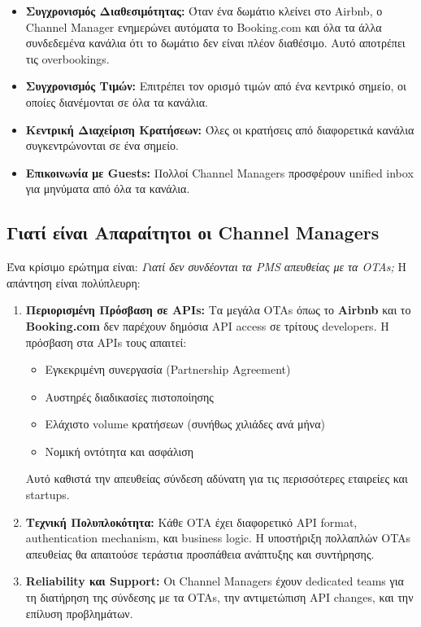 \documentclass[
	12pt, %
	oneside, %
	greek,
	onehalfspacing, %
	liststotoc, %
	toctotoc, %
	parskip, %
	headsepline, %
]{MastersDoctoralThesis} %
\begin{document}
\begin{itemize}
    \item \textbf{Συγχρονισμός Διαθεσιμότητας:} Όταν ένα δωμάτιο κλείνει στο Airbnb, ο Channel Manager ενημερώνει αυτόματα το Booking.com και όλα τα άλλα συνδεδεμένα κανάλια ότι το δωμάτιο δεν είναι πλέον διαθέσιμο. Αυτό αποτρέπει τις overbookings.
    \item \textbf{Συγχρονισμός Τιμών:} Επιτρέπει τον ορισμό τιμών από ένα κεντρικό σημείο, οι οποίες διανέμονται σε όλα τα κανάλια.
    \item \textbf{Κεντρική Διαχείριση Κρατήσεων:} Όλες οι κρατήσεις από διαφορετικά κανάλια συγκεντρώνονται σε ένα σημείο.
    \item \textbf{Επικοινωνία με Guests:} Πολλοί Channel Managers προσφέρουν unified inbox για μηνύματα από όλα τα κανάλια.
\end{itemize}

\subsection{Γιατί είναι Απαραίτητοι οι Channel Managers}
\label{subsec:why-channel-managers}

Ένα κρίσιμο ερώτημα είναι: \textit{Γιατί δεν συνδέονται τα PMS απευθείας με τα OTAs;} Η απάντηση είναι πολύπλευρη:

\begin{enumerate}
    \item \textbf{Περιορισμένη Πρόσβαση σε APIs:} Τα μεγάλα OTAs όπως το \textbf{Airbnb} και το \textbf{Booking.com} δεν παρέχουν δημόσια API access σε τρίτους developers. Η πρόσβαση στα APIs τους απαιτεί:
    \begin{itemize}
        \item Εγκεκριμένη συνεργασία (Partnership Agreement)
        \item Αυστηρές διαδικασίες πιστοποίησης
        \item Ελάχιστο volume κρατήσεων (συνήθως χιλιάδες ανά μήνα)
        \item Νομική οντότητα και ασφάλιση
    \end{itemize}
    Αυτό καθιστά την απευθείας σύνδεση αδύνατη για τις περισσότερες εταιρείες και startups.
    
    \item \textbf{Τεχνική Πολυπλοκότητα:} Κάθε OTA έχει διαφορετικό API format, authentication mechanism, και business logic. Η υποστήριξη πολλαπλών OTAs απευθείας θα απαιτούσε τεράστια προσπάθεια ανάπτυξης και συντήρησης.
    
    \item \textbf{Reliability και Support:} Οι Channel Managers έχουν dedicated teams για τη διατήρηση της σύνδεσης με τα OTAs, την αντιμετώπιση API changes, και την επίλυση προβλημάτων.
\end{enumerate}
\end{document}
